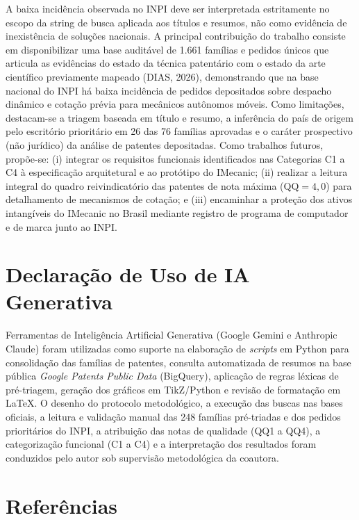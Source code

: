 \documentclass[12pt,a4paper]{article}
\begin{document}
A baixa incidência observada no INPI deve ser interpretada estritamente no escopo da string de busca aplicada aos títulos e resumos, não como evidência de inexistência de soluções nacionais. A principal contribuição do trabalho consiste em disponibilizar uma base auditável de 1.661 famílias e pedidos únicos que articula as evidências do estado da técnica patentário com o estado da arte científico previamente mapeado (DIAS, 2026), demonstrando que na base nacional do INPI há baixa incidência de pedidos depositados sobre despacho dinâmico e cotação prévia para mecânicos autônomos móveis. Como limitações, destacam-se a triagem baseada em título e resumo, a inferência do país de origem pelo escritório prioritário em 26 das 76 famílias aprovadas e o caráter prospectivo (não jurídico) da análise de patentes depositadas. Como trabalhos futuros, propõe-se: (i) integrar os requisitos funcionais identificados nas Categorias C1 a C4 à especificação arquitetural e ao protótipo do IMecanic; (ii) realizar a leitura integral do quadro reivindicatório das patentes de nota máxima ($\text{QQ} = 4{,}0$) para detalhamento de mecanismos de cotação; e (iii) encaminhar a proteção dos ativos intangíveis do IMecanic no Brasil mediante registro de programa de computador e de marca junto ao INPI.

\section*{Declaração de Uso de IA Generativa}
Ferramentas de Inteligência Artificial Generativa (Google Gemini e Anthropic Claude) foram utilizadas como suporte na elaboração de \textit{scripts} em Python para consolidação das famílias de patentes, consulta automatizada de resumos na base pública \textit{Google Patents Public Data} (BigQuery), aplicação de regras léxicas de pré-triagem, geração dos gráficos em TikZ/Python e revisão de formatação em \LaTeX. O desenho do protocolo metodológico, a execução das buscas nas bases oficiais, a leitura e validação manual das 248 famílias pré-triadas e dos pedidos prioritários do INPI, a atribuição das notas de qualidade (QQ1 a QQ4), a categorização funcional (C1 a C4) e a interpretação dos resultados foram conduzidos pelo autor sob supervisão metodológica da coautora.

\section*{Referências}
\begingroup
\setlength{\parindent}{0pt}
\setlength{\parskip}{6pt}
\end{document}
